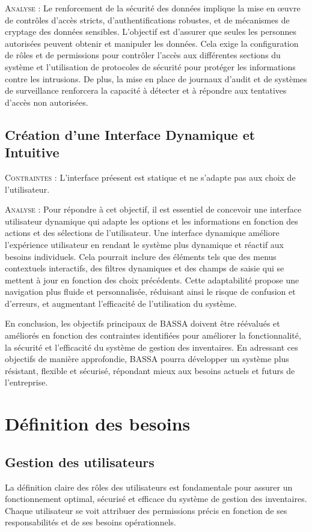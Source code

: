 \documentclass[a4paper, oneside, 12pt, final]{extreport}
\begin{document}
\textsc{Analyse} : Le renforcement de la sécurité des données implique la mise en œuvre de contrôles d’accès stricts, d’authentifications robustes, et de mécanismes de cryptage des données sensibles. L’objectif est d’assurer que seules les personnes autorisées peuvent obtenir et manipuler les données. Cela exige la configuration de rôles et de permissions pour contrôler l’accès aux différentes sections du système et l’utilisation de protocoles de sécurité pour protéger les informations contre les intrusions. De plus, la mise en place de journaux d’audit et de systèmes de surveillance renforcera la capacité à détecter et à répondre aux tentatives d'accès non autorisées.

\subsection{Création d’une Interface Dynamique et Intuitive}
\textsc{Contraintes} : L’interface préesent est statique et ne s’adapte pas aux choix de l’utilisateur.

\textsc{Analyse} : Pour répondre à cet objectif, il est essentiel de concevoir une interface utilisateur dynamique qui adapte les options et les informations en fonction des actions et des sélections de l’utilisateur. Une interface dynamique améliore l’expérience utilisateur en rendant le système plus dynamique et réactif aux besoins individuels. Cela pourrait inclure des éléments tels que des menus contextuels interactifs, des filtres dynamiques et des champs de saisie qui se mettent à jour en fonction des choix précédents. Cette adaptabilité propose une navigation plus fluide et personnalisée, réduisant ainsi le risque de confusion et d’erreurs, et augmentant l’efficacité de l’utilisation du système.

En conclusion, les objectifs principaux de BASSA doivent être réévalués et améliorés en fonction des contraintes identifiées pour améliorer la fonctionnalité, la sécurité et l’efficacité du système de gestion des inventaires. En adressant ces objectifs de manière approfondie, BASSA pourra développer un système plus résistant, flexible et sécurisé, répondant mieux aux besoins actuels et futurs de l’entreprise.
\section{Définition des besoins}
\subsection{Gestion des utilisateurs}
La définition claire des rôles des utilisateurs est fondamentale pour assurer un fonctionnement optimal, sécurisé et efficace du système de gestion des inventaires. Chaque utilisateur se voit attribuer des permissions précis en fonction de ses responsabilités et de ses besoins opérationnels.
\end{document}
